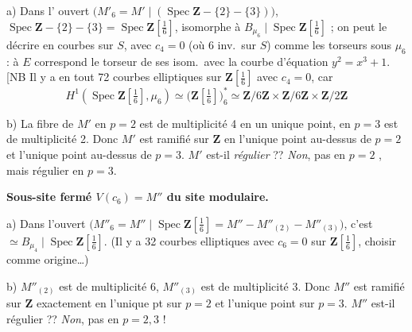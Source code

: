 \documentclass[11pt,a4paper]{article}
\begin{document}
a) Dans l' ouvert $\bigl(M'_6 = M' \mid (\operatorname{Spec}
\mathbf{Z} - \lbrace 2\rbrace - \lbrace 3\rbrace)\bigr)$, $\operatorname{Spec}
\mathbf{Z} - \lbrace 2\rbrace - \lbrace 3\rbrace = \operatorname{Spec}\mathbf{Z}[\tfrac16]$,
 isomorphe à 
$B_{\mu_6} \mid \operatorname{Spec}\mathbf{Z}[\tfrac16]$ ; on peut le décrire
\struck{\ill{}} en courbes   sur
$S$, avec $c_4=0$ (où 6 inv.\ sur $S$) comme les torseurs sous $\mu_6$ : à
$E$ correspond le torseur de ses isom.\ avec la courbe d'équation
\struck{\ill{}}  $y^2=x^3+1$. [NB Il y a en tout 72
courbes elliptiques sur $\mathbf{Z}[\tfrac16]$ avec $c_4=0$, car
\[
H^1(\operatorname{Spec}\mathbf{Z}[\tfrac16], \mu_6) \simeq
\bigl(\mathbf{Z}[\tfrac16]\bigr)^{*}_{6} \simeq \mathbf{Z}/6\mathbf{Z}
\times \mathbf{Z}/6\mathbf{Z} \times \mathbf{Z}/2\mathbf{Z}
\]

b) La fibre de $M'$ en $p=2$ est de \struck{\ill{}} multiplicité 4 en un
unique point, en $p=3$ est de multiplicité 2. Donc $M'$ est ramifié sur
$\mathbf{Z}$  en l'unique point au-dessus de $p=2$ et
l'unique point au-dessus de $p=3$. $M'$ est-il \emph{régulier} ?? \emph{Non},
pas en $p=2$ \struck{\ill{}}, mais régulier en $p=3$.

\textbf{Sous-site fermé $V(c_6) = M''$ du site modulaire.}

a) Dans l'ouvert $\bigl(M''_6 = M'' \mid \operatorname{Spec}\mathbf{Z}[\tfrac16]
= M'' - M''_{(2)} - M''_{(3)}\bigr)$, c'est $\simeq B_{\mu_4} \mid
\operatorname{Spec}\mathbf{Z}[\tfrac16]$. (Il y a 32 courbes elliptiques avec
$c_6=0$ sur $\mathbf{Z}[\tfrac16]$, \ill{} \ill{} choisir comme
origine\ldots)

b) $M''_{(2)}$ est de multiplicité 6, $M''_{(3)}$ est de multiplicité 3.
Donc $M''$ est ramifié sur $\mathbf{Z}$ exactement en l'unique pt sur $p=2$
et l'unique point sur $p=3$. $M''$ est-il régulier ?? \emph{Non}, pas en
$p=2,3$ !

\end{document}
